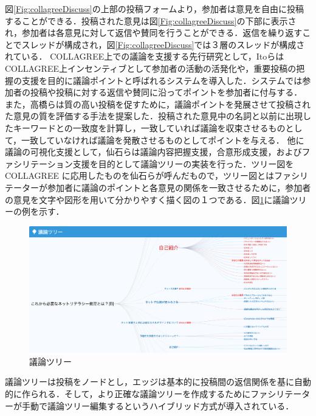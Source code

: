 図\ref{Fig:collagreeDiscuss}の上部の投稿フォームより，参加者は意見を自由に投稿することができる．投稿された意見は図\ref{Fig:collagreeDiscuss}の下部に表示され，参加者は各意見に対して返信や賛同を行うことができる．返信を繰り返すことでスレッドが構成され，図\ref{Fig:collagreeDiscuss}では３層のスレッドが構成されている．
%
COLLAGREE上での議論を支援する先行研究として，Itoら\cite{discSupport1-1}はCOLLAGREE上インセンティブとして参加者の活動の活発化や，重要投稿の把握の支援を目的に議論ポイントと呼ばれるシステムを導入した．システムでは参加者の投稿や投稿に対する返信や賛同に沿ってポイントを参加者に付与する．
また，高橋ら\cite{discSupport1-2}は質の高い投稿を促すために，議論ポイントを発展させて投稿された意見の質を評価する手法を提案した．投稿された意見中の名詞と以前に出現したキーワードとの一致度を計算し，一致していれば議論を収束させるものとして，一致していなければ議論を発散させるものとしてポイントを与える．
他に議論の可視化支援として，仙石ら\cite{argTree}は議論内容把握支援，合意形成支援，およびファシリテーション支援を目的として議論ツリーの実装を行った．ツリー図をCOLLAGREE に応用したものを仙石らが呼んだもので，ツリー図とはファシリテーターが参加者に議論のポイントと各意見の関係を一致させるために，参加者の意見を文字や図形を用いて分かりやすく描く図の１つである．図\ref{Fig:argTree1}に議論ツリーの例を示す．
\begin{figure}[htbp]
 \begin{center}
  \includegraphics[width=\textwidth]{../images/2.Related_Work/argTree1.png}
  \caption{議論ツリー}
  \label{Fig:argTree1}
  \vspace{-10pt}
 \end{center}
\end{figure}
議論ツリーは投稿をノードとし，エッジは基本的に投稿間の返信関係を基に自動的に作られる．そして，より正確な議論ツリーを作成するためにファシリテーターが手動で議論ツリー編集するというハイブリッド方式が導入されている．

